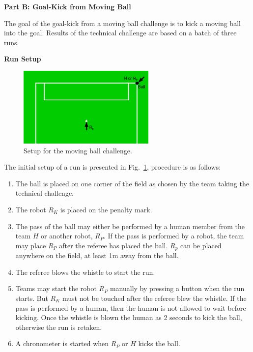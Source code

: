 \clearpage
\sffamily
{\bfseries\color[rgb]{0.4,0.4,0.4}
Part B: Goal-Kick from Moving Ball}
{}


\bigskip

The goal of the goal-kick from a moving ball challenge is to kick a moving ball
into the goal. Results of the technical challenge are based on a batch of three runs.

\bigskip

{\bfseries Run Setup}

\smallskip

\begin{figure}[h]
\begin{center}
\includegraphics[width=0.6\textwidth]{img/tc_dynamic_kick.png}
\caption{\label{fig:tc_dynamic_kick}Setup for the moving ball challenge.}
\end{center}
\end{figure}

The initial setup of a run is presented in Fig.~\ref{fig:tc_dynamic_kick},
procedure is as follows:


\begin{enumerate}
\item The ball is placed on one corner of the field as chosen by the team taking the
technical challenge.
\item The robot $R_K$ is placed on the penalty mark.
\item The pass of the ball may either be performed by a human member from the
team $H$ or another robot, $R_P$. If the pass is performed by a robot, the team
may place $R_P$ after the referee has placed the ball. $R_p$ can be placed
anywhere on the field, at least 1m away from the ball.
\item The referee blows the whistle to start the run.
\item Teams may start the robot $R_P$ manually by pressing a button when the
run starts. But $R_K$ must not be touched after the referee blew the whistle. If
the pass is performed by a human, then the human is not allowed to wait before
kicking. Once the whistle is blown the human as 2 seconds to kick the ball,
otherwise the run is retaken.
\item A chronometer is started when $R_P$ or $H$ kicks the ball.
\end{enumerate}

